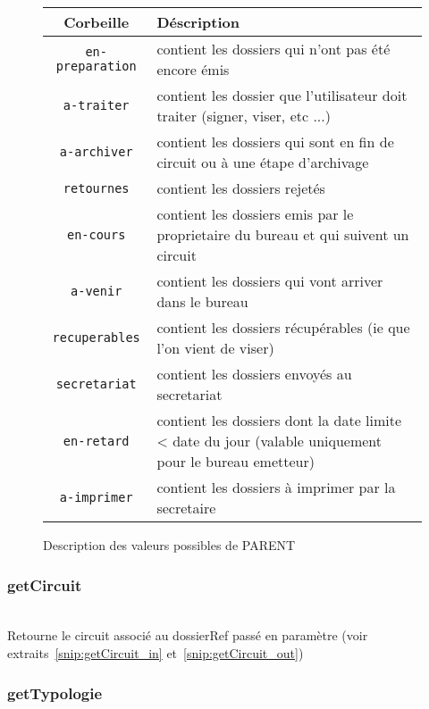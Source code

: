 \begin{figure}
\begin{center}
\begin{tabular}{c|p{7cm}}
	\hline
	Corbeille & Déscription \\
	\hline
        \verb|en-preparation| & contient les dossiers qui n'ont pas été encore émis  \\
        \verb|a-traiter| & contient les dossier que l'utilisateur doit traiter (signer, viser, etc ...) \\
        \verb|a-archiver| & contient les dossiers qui sont en fin de circuit ou à une étape d'archivage \\
        \verb|retournes| & contient les dossiers rejetés \\
        \verb|en-cours| & contient les dossiers emis par le proprietaire du bureau et qui suivent un circuit \\
        \verb|a-venir| & contient les dossiers qui vont arriver dans le bureau \\
        \verb|recuperables| & contient les dossiers récupérables (ie que l'on vient de viser) \\
        \verb|secretariat| & contient les dossiers envoyés au secretariat \\
        \verb|en-retard| & contient les dossiers dont la date limite < date du jour (valable uniquement pour le bureau emetteur) \\
        \verb|a-imprimer| & contient les dossiers à imprimer par la secretaire


\end{tabular}
\end{center}
\caption{Description des valeurs possibles de PARENT}
\label{table:parent_values}
\end{figure}


\subsubsection{getCircuit}
\\


Retourne le circuit associé au dossierRef passé en paramètre (voir extraits~\ref{snip:getCircuit_in} et~\ref{snip:getCircuit_out}) 



\subsubsection{getTypologie}
\\

